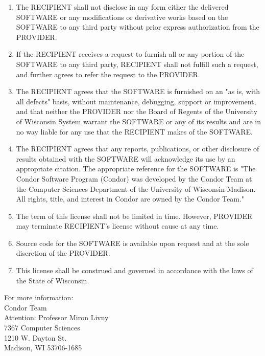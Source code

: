 \begin{enumerate}
\item The RECIPIENT shall not disclose in any form either the
delivered SOFTWARE or any modifications or derivative works based on
the SOFTWARE to any third party without prior express authorization
from the PROVIDER.

\item If the RECIPIENT receives a request to furnish all or any
portion of the SOFTWARE to any third party, RECIPIENT shall not
fulfill such a request, and further agrees to refer the request to the
PROVIDER.

\item The RECIPIENT agrees that the SOFTWARE is furnished on an "as
is, with all defects" basis, without maintenance, debugging, support
or improvement, and that neither the PROVIDER nor the Board of Regents
of the University of Wisconsin System warrant the SOFTWARE or any of
its results and are in no way liable for any use that the RECIPIENT
makes of the SOFTWARE.

\item The RECIPIENT agrees that any reports, publications, or other
disclosure of results obtained with the SOFTWARE will acknowledge its
use by an appropriate citation. The appropriate reference for the
SOFTWARE is "The Condor Software Program (Condor) was developed by the
Condor Team at the Computer Sciences Department of the University of
Wisconsin-Madison. All rights, title, and interest in Condor are owned
by the Condor Team."

\item The term of this license shall not be limited in time. However,
PROVIDER may terminate RECIPIENT's license without cause at any
time.

\item Source code for the SOFTWARE is available upon request and at
the sole discretion of the PROVIDER.

\item This license shall be construed and governed in accordance with
the laws of the State of Wisconsin.

\end{enumerate}

\begin{flushleft}
For more information: \\

Condor Team \\
Attention: Professor Miron Livny \\
7367 Computer Sciences \\ 
1210 W. Dayton St. \\
Madison, WI 53706-1685 \\
 \\
 \\
\end{flushleft}





